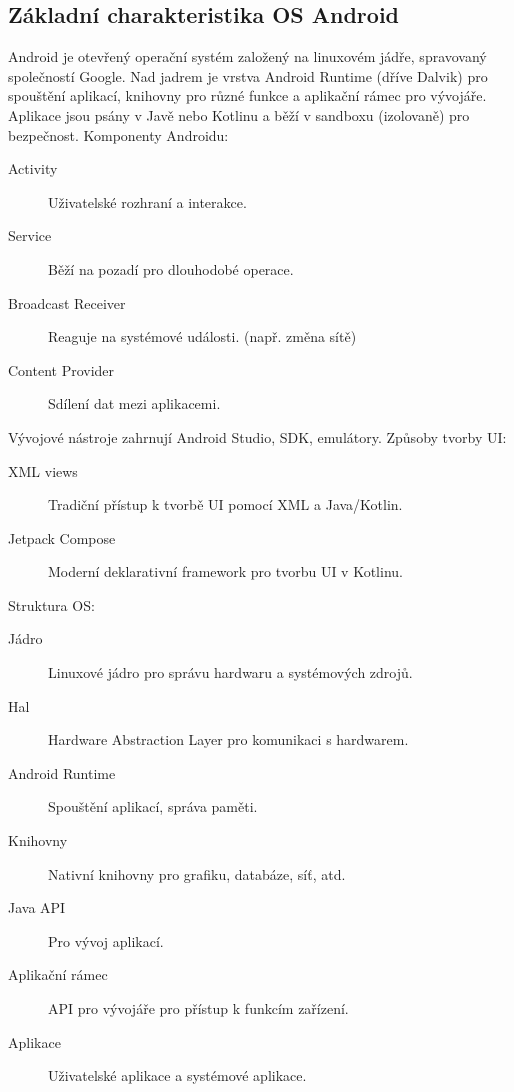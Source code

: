 \subsection{Základní charakteristika OS Android}

Android je otevřený operační systém založený na linuxovém jádře, spravovaný společností 
Google. Nad jadrem je vrstva Android Runtime (dříve Dalvik) pro spouštění aplikací, 
knihovny pro různé funkce a aplikační rámec pro vývojáře. Aplikace jsou psány v Javě 
nebo Kotlinu a běží v sandboxu (izolovaně) pro bezpečnost. 
Komponenty Androidu:
\begin{description}
    \item[Activity] Uživatelské rozhraní a interakce.
    \item[Service] Běží na pozadí pro dlouhodobé operace.
    \item[Broadcast Receiver] Reaguje na systémové události. (např. změna sítě)
    \item[Content Provider] Sdílení dat mezi aplikacemi.
\end{description}
Vývojové nástroje zahrnují Android Studio, SDK, emulátory. Způsoby tvorby UI: 
\begin{description}
    \item[XML views] Tradiční přístup k tvorbě UI pomocí XML a Java/Kotlin.
    \item[Jetpack Compose] Moderní deklarativní framework pro tvorbu UI v Kotlinu.
\end{description}
Struktura OS:
\begin{description}
    \item[Jádro] Linuxové jádro pro správu hardwaru a systémových zdrojů.
    \item[Hal] Hardware Abstraction Layer pro komunikaci s hardwarem.
    \item[Android Runtime] Spouštění aplikací, správa paměti.
    \item[Knihovny] Nativní knihovny pro grafiku, databáze, síť, atd.
    \item[Java API] Pro vývoj aplikací.
    \item[Aplikační rámec] API pro vývojáře pro přístup k funkcím zařízení.
    \item[Aplikace] Uživatelské aplikace a systémové aplikace.
\end{description}

